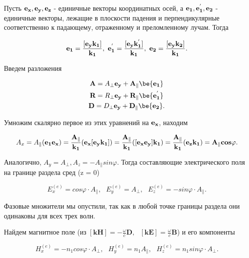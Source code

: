 \documentclass[a4paper]{article}
\begin{document}
Пусть $\bf{e_x, e_y, e_z}$ - единичные векторы координатных осей, а $\bf{e_1, e_1^{'}, e_2}$ - единичные векторы, лежащие в плоскости падения и перпендикулярные соответственно к падающему, отраженному и преломленному лучам. Тогда

\begin{equation}
\bf{e_1} = \frac{[e_y \bf{k_1}]}{k_1}, \text{   } \bf{e_1^{'}} = \frac{[e_y \bf{k_1^{'}}]}{k_1}, \text{     }
\bf{e_2} = \frac{[e_y \bf{k_2}]}{k_1}.
\end{equation}

Введем разложения

\begin{equation}
\begin{gathered}

\textbf{A} = A_{\perp}\bf{e_y} + A_{\parallel} \be{e_1} \\
\textbf{R} = R_{\perp}\bf{e_y} + R_{\parallel} \be{e_1^{'}} \\
\textbf{D} = D_{\perp}\bf{e_y} + D_{\parallel} \be{e_2}. 

\end{gathered}
\end{equation}

Умножим скалярно первое из этих уравнений на $\bf{e_x}$, находим

\begin{equation}
A_x = A_{\parallel}(\bf{e_1e_x}) = \frac{A_{\parallel}}{k_1}(\bf{e_x[e_yk_1]}) = \frac{A_{\parallel}}{k_1}(\bf[e_xe_y]k_1)=\frac{A_{\parallel}}{k_1}(\bf{e_zk_1}) = A_{\parallel}cos\varphi.
\end{equation}

Аналогично, $A_y = A_{\perp}, A_z = -A_{\parallel} sin\varphi. $ Тогда составляющие электрического поля на границе раздела сред (z = 0)

\begin{equation}
E_x^{(e)} = cos\varphi \cdot A_{\parallel}, \text{     } E_y^{(e)} = A_{\perp}, \text{     }
E_z^{(e)} = -sin\varphi \cdot A_{\parallel}.  
\end{equation}

Фазовые множители мы опустили, так как в любой точке границы раздела они одинаковы для всех трех волн.

Найдем магнитное поле (из $[\textbf{kH}] = -\frac{\omega}{c}\textbf{D}, \text{     } [\textbf{kE}] = \frac{\omega}{c}\textbf{B}$) и его компоненты

\begin{equation}
H_x^{(e)} = -n_1 cos\varphi \cdot A_{\perp}, \text{     } H_y^{(e)} = n_1A_{\parallel}, \text{     }
H_z^{(e)} = n_1sin\varphi \cdot A_{\perp}.  
\end{equation}
\end{document}
